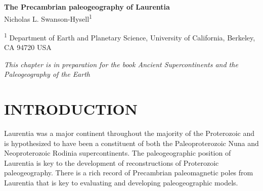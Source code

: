 \documentclass[11pt,letterpaper]{article}
\begin{document}
\begin{flushleft}
{\Large \textbf{The Precambrian paleogeography of Laurentia}}
\\

Nicholas L. Swanson-Hysell\textsuperscript{1}

\bigskip

\textsuperscript{1} Department of Earth and Planetary Science, University of California, Berkeley, CA 94720 USA

\end{flushleft}

\noindent\textit{This chapter is in preparation for the book Ancient Supercontinents and the Paleogeography of the Earth}


\section*{INTRODUCTION}

Laurentia was a major continent throughout the majority of the Proterozoic and is hypothesized to have been a constituent of both the Paleoproterozoic Nuna and Neoproterozoic Rodinia supercontinents. The paleogeographic position of Laurentia is key to the development of reconstructions of Proterozoic paleogeography. There is a rich record of Precambrian paleomagnetic poles from Laurentia that is key to evaluating and developing paleogeographic models.
\end{document}
